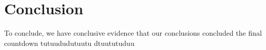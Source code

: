 \section{Conclusion}

To conclude, we have conclusive evidence that our conclusions concluded the final countdown tutuududutuutu dtuututuduu